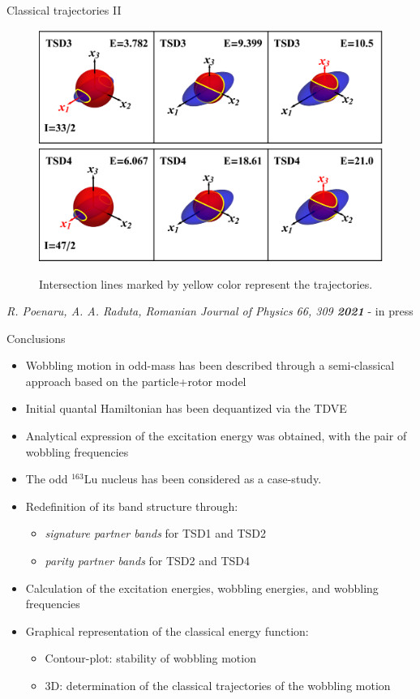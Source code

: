 \documentclass{beamer}
\begin{document}
\begin{frame}{Classical trajectories II}
\begin{figure}
    \centering
    \includegraphics[scale=0.45]{figs/tsd3_spin1.eps}
    \includegraphics[scale=0.45]{figs/tsd4_spin1.eps}
    \caption{Intersection lines marked by yellow color represent the trajectories.}
\end{figure}
\footnotesize{\textit{R. Poenaru, A. A. Raduta, Romanian Journal of Physics 66, 309 \textbf{2021}} - in press}
\end{frame}

\begin{frame}{Conclusions}
    \begin{itemize}
        \item Wobbling motion in odd-mass has been described through a semi-classical approach based on the particle+rotor model
        \item Initial quantal Hamiltonian has been dequantized via the TDVE
        \item Analytical expression of the excitation energy was obtained, with the pair of wobbling frequencies
        \item The odd $^{163}$Lu nucleus has been considered as a case-study.
        \item Redefinition of its band structure through:
        \begin{itemize}
            \item \emph{signature partner bands} for TSD1 and TSD2
            \item \emph{parity partner bands} for TSD2 and TSD4
        \end{itemize}
        \item Calculation of the excitation energies, wobbling energies, and wobbling frequencies
        \item Graphical representation of the classical energy function:
        \begin{itemize}
            \item Contour-plot: stability of wobbling motion
            \item 3D: determination of the classical trajectories of the wobbling motion
        \end{itemize}
    \end{itemize}
\end{frame}
\end{document}
